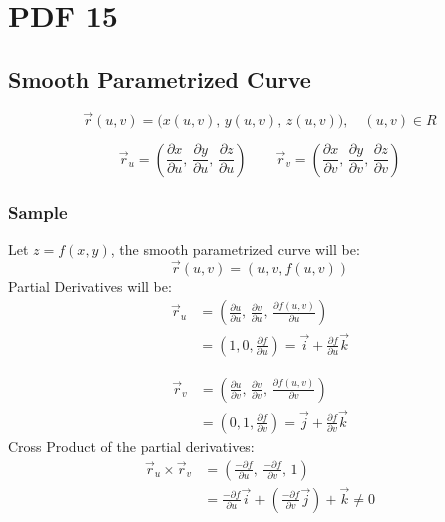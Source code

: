 \documentclass[12pt, fleqn]{book}
\begin{document}
\chapter{PDF 15}\label{pdf15}
	\section{Smooth Parametrized Curve}
		\begin{equation}
			\vec{r}(u, v) = \big(x(u, v), \, y(u, v), \, z(u, v)\big), \quad (u, v) \in R
		\end{equation}
		
		\begin{equation}
			\vec{r}_u = (\frac{\partial x}{\partial u}, \, \frac{\partial y}{\partial u}, \, \frac{\partial z}{\partial u}) \qquad \vec{r}_v = (\frac{\partial x}{\partial v}, \, \frac{\partial y}{\partial v}, \, \frac{\partial z}{\partial v}) 
		\end{equation}	
		\subsection{Sample}
			Let $z = f(x, y)$, the smooth parametrized curve will be:
				\begin{equation}
					\vec{r}(u, v) = (u, v, f(u, v))
				\end{equation}
		 	Partial Derivatives will be:
			 	\begin{equation}
				 	\begin{split}
				 		\vec{r}_u 
				 		& = (
				 			\frac{\partial u}{\partial u}, \,
				 			\frac{\partial v}{\partial u}, \,
				 			\frac{\partial f(u, v)}{\partial u}
				 		) \\
				 		& = (1, 0, \frac{\partial f}{\partial u})
			              = \vec{i} + \frac{\partial f}{\partial u} \vec{k}
				 	\end{split}
			 	\end{equation}
		 	
			 	\begin{equation}
				 	\begin{split}
						\vec{r}_v 
						& = (
								\frac{\partial u}{\partial v}, \,
								\frac{\partial v}{\partial v}, \,
								\frac{\partial f(u, v)}{\partial v}
							) \\
						& = (0, 1, \frac{\partial f}{\partial v})
						  = \vec{j} + \frac{\partial f}{\partial v} \vec{k}
					\end{split}
				\end{equation}
	 	    Cross Product of the partial derivatives:
	 	    \begin{equation}
				\begin{split}
					\vec{r}_u \times \vec{r}_v 
					& = (
						\frac{- \partial f}{\partial u}, \, 
						\frac{- \partial f}{\partial v}, \, 
						1
					) \\
					& = \frac{- \partial f}{\partial u} \vec{i} +
					    (\frac{- \partial f}{\partial v} \vec{j}) + 
					    \vec{k} \neq 0
				\end{split}
			\end{equation}
\end{document}
